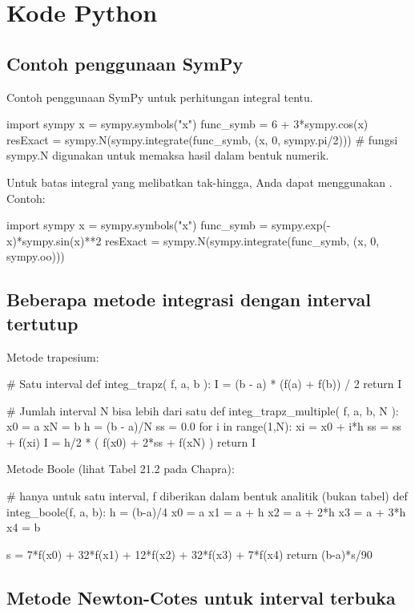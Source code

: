 \section*{Kode Python}

\subsection*{Contoh penggunaan SymPy}
Contoh penggunaan SymPy untuk perhitungan integral tentu.
\begin{pythoncode}
import sympy
x = sympy.symbols("x")
func_symb = 6 + 3*sympy.cos(x)
resExact = sympy.N(sympy.integrate(func_symb, (x, 0, sympy.pi/2)))
# fungsi sympy.N digunakan untuk memaksa hasil dalam bentuk numerik.
\end{pythoncode}

Untuk batas integral yang melibatkan tak-hingga, Anda dapat menggunakan
. Contoh:
\begin{pythoncode}
import sympy
x = sympy.symbols("x")
func_symb = sympy.exp(-x)*sympy.sin(x)**2
resExact = sympy.N(sympy.integrate(func_symb, (x, 0, sympy.oo)))
\end{pythoncode}

\subsection*{Beberapa metode integrasi dengan interval tertutup}

Metode trapesium:
\begin{pythoncode}
# Satu interval
def integ_trapz( f, a, b ):
    I = (b - a) * (f(a) + f(b)) / 2
    return I

# Jumlah interval N bisa lebih dari satu
def integ_trapz_multiple( f, a, b, N ):
    x0 = a
    xN = b
    h = (b - a)/N
    ss = 0.0
    for i in range(1,N):
        xi = x0 + i*h
        ss = ss + f(xi)
    I = h/2 * ( f(x0) + 2*ss + f(xN) )
    return I
\end{pythoncode}

Metode Boole (lihat Tabel 21.2 pada Chapra):
\begin{pythoncode}
# hanya untuk satu interval, f diberikan dalam bentuk analitik (bukan tabel)
def integ_boole(f, a, b):
    h = (b-a)/4
    x0 = a
    x1 = a + h
    x2 = a + 2*h
    x3 = a + 3*h
    x4 = b

    s = 7*f(x0) + 32*f(x1) + 12*f(x2) + 32*f(x3) + 7*f(x4)
    return (b-a)*s/90
\end{pythoncode}

\subsection*{Metode Newton-Cotes untuk interval terbuka}

